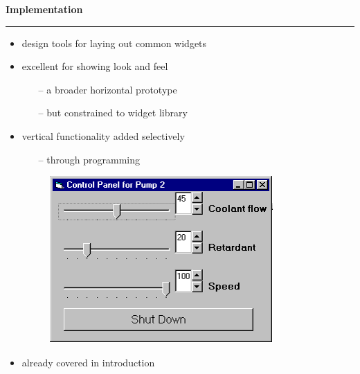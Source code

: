 \documentclass[pdf]{beamer}
\begin{document}
\begin{frame}
\vspace{8mm}
\textcolor{myBlue}{\textbf{\Large{Implementation}}}

\textcolor{red}{\rule{10cm}{1mm}}

\begin{itemize}
\item design tools for laying out common widgets 
\item excellent for showing look and feel
\begin{itemize}
      \item[\textcolor{black}{--}] a broader horizontal prototype
      
      \item[\textcolor{black}{--}] but constrained to widget library
  \end{itemize}
  
\item vertical functionality added selectively
\begin{itemize}
      \item[\textcolor{black}{--}] through programming
  \end{itemize}
  \begin{figure}[b]
    	\includegraphics[scale = 0.5,right]{36_1.png}
    \end{figure}
\item already covered in introduction
\end{itemize}
\end{frame}
\end{document}
